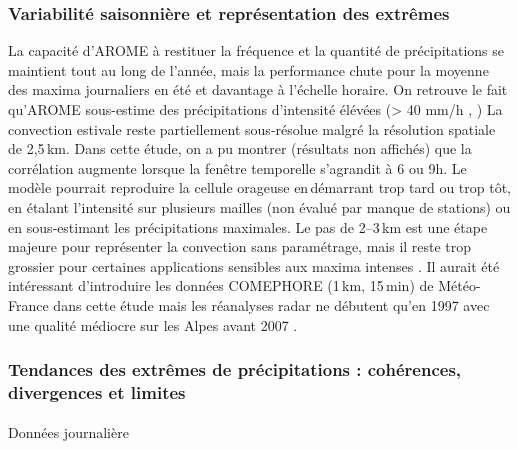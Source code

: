 \documentclass[
  article,
  nofooter,
  noheadings]{jss}
\makeatletter
\let\oldparagraph\paragraph
\renewcommand{\paragraph}{
    \@ifstar
      \xxxParagraphStar
      \xxxParagraphNoStar
  }
\newcommand{\xxxParagraphStar}[1]{\oldparagraph*{#1}\mbox{}}
\newcommand{\xxxParagraphNoStar}[1]{\oldparagraph{#1}\mbox{}}
\makeatother
\begin{document}
\subsubsection{Variabilité saisonnière et représentation des
extrêmes}\label{variabilituxe9-saisonniuxe8re-et-repruxe9sentation-des-extruxeames}

La capacité d'AROME à restituer la fréquence et la quantité de
précipitations se maintient tout au long de l'année, mais la performance
chute pour la moyenne des maxima journaliers en été et davantage à
l'échelle horaire. On retrouve le fait qu'AROME sous-estime des
précipitations d'intensité élévées (\textgreater{} 40 mm/h
\citep{Caillaud2021}, \citep{poncet2024convection}) La convection
estivale reste partiellement sous‑résolue malgré la résolution spatiale
de 2,5\,km. Dans cette étude, on a pu montrer (résultats non affichés)
que la corrélation augmente lorsque la fenêtre temporelle s'agrandit à 6
ou 9h. Le modèle pourrait reproduire la cellule orageuse en\,démarrant
trop tard ou trop tôt, en étalant l'intensité sur plusieurs mailles (non
évalué par manque de stations) ou en sous‑estimant les précipitations
maximales. Le pas de 2--3\,km est une étape majeure pour représenter la
convection sans paramétrage, mais il reste trop grossier pour certaines
applications sensibles aux maxima intenses \citep{Prein2015Review}. Il
aurait été intéressant d'introduire les données COMEPHORE (1\,km,
15\,min) de Météo-France dans cette étude mais les réanalyses radar ne
débutent qu'en 1997 avec une qualité médiocre sur les Alpes avant 2007
\citep{Fumiere2020}.

\subsubsection{Tendances des extrêmes de précipitations : cohérences,
divergences et
limites}\label{tendances-des-extruxeames-de-pruxe9cipitations-cohuxe9rences-divergences-et-limites}

\paragraph{Données journalière}\label{donnuxe9es-journaliuxe8re}
\end{document}
